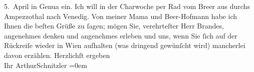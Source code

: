 \begin{ledgroupsized}[t]{13cm}
                  5. April in Genua ein. Ich will
               in der Charwoche per Rad vom Bre{\geminationn}er aus durchs Ampezzothal
               nach Venedig.\pend
           \pstart
           Von meiner Mama und Beer-Hofmann habe ich Ihnen die beſten Grüße zu
               ſagen; {\pb}mögen Sie, verehrteſter Herr Brandes,
               angenehmes denken und angenehmes erleben und uns, wenn Sie ſich auf der Rückreiſe
               wieder in Wien aufhalten (was dringend gewünſcht
               wird) mancherlei davon erzählen.\pend
           \pstart
           Herzlichſt ergeben{\\[\baselineskip]}Ihr \spacefill\mbox{ArthurSchnitzler}\pend
           \leftskip=0em{}
         
         \endnumbering{}\end{ledgroupsized}  \newcommand{\dateiname}{L00787}\newcommand{\titel}{Arthur Schnitzler an Georg Brandes, 27. 3. 1898}\newcommand{\editorInnen}{Martin Anton Müller und Gerd-Hermann Susen}
      